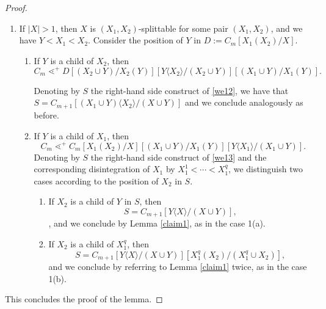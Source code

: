 \documentclass{article}
\theoremstyle{plain}
\theoremstyle{definition}
\begin{document}
\begin{proof}
\begin{enumerate}
\begin{enumerate}
\item Otherwise, $Y_2$ is a child of $X^1$. Then we continue \eqref{we10} as follows: 
\begin{equation}
S \lessdot^+ S[(X^1\cup Y_2)/X_1(Y_2)][Y_2\langle X^1\rangle/(X^1\cup Y_2)].\label{we11}
\end{equation}
Since $S[(X^1\cup Y_2)/X_1(Y_2)]=C_{m+1}[Y_1 \langle X\cup Y_2\rangle /(X\cup Y)]$, denoting by $S'$ the right-hand side construct of \eqref{we11}, we have that $$S'=C_{m+1}[Y_1 \langle X\cup Y_2\rangle /(X\cup Y)][Y_2\langle X^1\rangle/(X^1\cup Y_2)].$$ By applying Lemma \ref{claim1} twice, we get
a sequence $\widetilde{P^r}=(S'\lessdot \cdots\lessdot C_m)$ such that $\#(\widetilde{P^r})\leq\#(P^r)$. We define $\widetilde{P}$ to be the concatenation of $P^l$, \eqref{we10}, \eqref{we11} and $\widetilde{P^r}$, and we conclude as in the previous case.
\end{enumerate}
\item If $|X|>1$, then $X$ is $(X_1,X_2)$-splittable for some pair $(X_1,X_2)$, and we have $Y<X_1<X_2$. Consider the position of $Y$ in $D:=C_m[X_1(X_2)/X]$.
\begin{enumerate}
\item If $Y$ is a child of $X_2$, then 
\begin{equation}
C_m \lessdot^+ D[(X_2\!\cup\! Y)/X_2(Y)][Y\langle X_2\rangle / (X_2\!\cup\! Y)][(X_1\!\cup \!Y)/X_1(Y)].
\label{we12}
\end{equation}

Denoting by $S$ the right-hand side construct of \eqref{we12}, we have that $S=C_{m+1}[(X_1\cup Y)\langle X_2\rangle/(X\cup Y)]$ and we conclude analogously as before. 
\item If $Y$ is a child of $X_1$, then 
\begin{equation}
C_m \lessdot^+ C_m[X_1(X_2)/X][(X_1\cup Y)/X_1(Y)][Y\langle X_1\rangle / (X_1\cup Y)].\label{we13}
\end{equation}
Denoting by $S$ the right-hand side construct of \eqref{we13} and the corresponding disintegration of $X_1$ by $X_1^1<\cdots <X_1^q$, we distinguish two cases according to the position of $X_2$ in $S$.
\begin{enumerate}
\item If $X_2$ is a child of $Y$ in $S$, then $$S=C_{m+1}[Y\langle X\rangle / (X\cup Y)],$$, and we conclude by Lemma \ref{claim1}, as in the case 1(a).
\item If $X_2$ is a child of $X_1^q$, then $$S=C_{m+1}[Y\langle X\rangle / (X\cup Y)][X_1^q(X_2)/(X_1^q\cup X_2)],$$ and we conclude by referring to Lemma \ref{claim1} twice, as in the case 1(b). 
\end{enumerate}
\end{enumerate}
\end{enumerate}
This concludes the proof of the lemma.
\end{proof}
\end{document}
